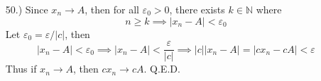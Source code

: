 \documentclass[12pt]{article}
\newcommand{\vertb}[1]{\left\vert#1\right\vert}
\newcommand{\e}{\varepsilon}
\begin{document}
\begin{itemize}
    \item [50.)] Since $x_n\to A$, then for all $\e_0>0$, there exists $k\in\mathbb{N}$ where
    \[n\geq k\implies\vertb{x_n-A}<\e_0\]
    Let $\e_0=\e/\vertb{c}$, then
    \[\vertb{x_n-A}<\e_0\implies\vertb{x_n-A}<\frac{\e}{\vertb{c}}\implies\vertb{c}\vertb{x_n-A}=\vertb{cx_n-cA}<\e\]
    Thus if $x_n\to A$, then $cx_n\to cA$. Q.E.D.












\end{itemize}
\end{document}
